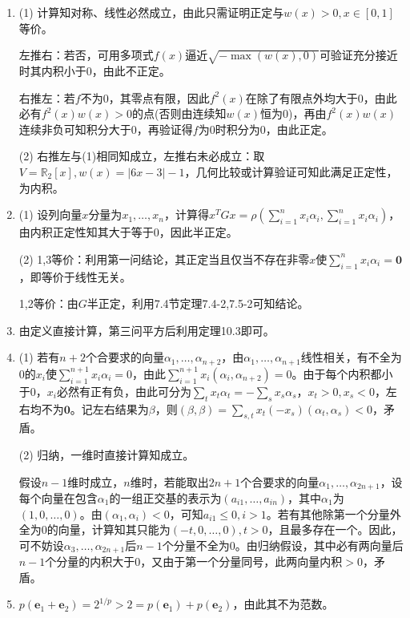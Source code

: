 \documentclass[a4paper,UTF8,fontset=windows]{ctexart}
\begin{document}
\begin{enumerate}
\item
(1) 计算知对称、线性必然成立，由此只需证明正定与$w(x)>0,x\in[0,1]$等价。

左推右：若否，可用多项式$f(x)$逼近$\sqrt{-\max(w(x),0)}$可验证充分接近时其内积小于0，由此不正定。

右推左：若$f$不为0，其零点有限，因此$f^2(x)$在除了有限点外均大于0，由此必有$f^2(x)w(x)>0$的点(否则由连续知$w(x)$恒为0)，再由$f^2(x)w(x)$连续非负可知积分大于0，再验证得$f$为0时积分为0，由此正定。

(2) 右推左与(1)相同知成立，左推右未必成立：取$V=\mathbb{R}_2[x],w(x)=|6x-3|-1$，几何比较或计算验证可知此满足正定性， 为内积。

\item
(1) 设列向量$x$分量为$x_1,\dots,x_n$，计算得$x^TGx=\rho\left(\sum_{i=1}^nx_i\alpha_i,\sum_{i=1}^nx_i\alpha_i\right)$，由内积正定性知其大于等于0，因此半正定。

(2) 1,3等价：利用第一问结论，其正定当且仅当不存在非零$x$使$\sum_{i=1}^nx_i\alpha_i=\mathbf{0}$，即等价于线性无关。

1,2等价：由$G$半正定，利用7.4节定理7.4-2,7.5-2可知结论。

\item
由定义直接计算，第三问平方后利用定理10.3即可。

\item
(1) 若有$n+2$个合要求的向量$\alpha_1,\dots,\alpha_{n+2}$，由$\alpha_1,\dots,\alpha_{n+1}$线性相关，有不全为0的$x_i$使$\sum_{i=1}^{n+1}x_i\alpha_i=0$，由此$\sum_{i=1}^{n+1}x_i(\alpha_i,\alpha_{n+2})=0$。由于每个内积都小于0，$x_i$必然有正有负，由此可分为$\sum_{t}x_t\alpha_t=-\sum_{s}x_s\alpha_s$，$x_t>0,x_s<0$，左右均不为$\mathbf{0}$。记左右结果为$\beta$，则$(\beta,\beta)=\sum_{s,t}x_t(-x_s)(\alpha_t,\alpha_s)<0$，矛盾。

(2) 归纳，一维时直接计算知成立。

假设$n-1$维时成立，$n$维时，若能取出$2n+1$个合要求的向量$\alpha_1,\dots,\alpha_{2n+1}$，设每个向量在包含$\alpha_1$的一组正交基的表示为$(a_{i1},\dots,a_{in})$，其中$\alpha_1$为$(1,0,\dots,0)$。由$(\alpha_1,\alpha_i)<0$，可知$a_{i1}\le0,i>1$。若有其他除第一个分量外全为0的向量，计算知其只能为$(-t,0,\dots,0),t>0$，且最多存在一个。因此，可不妨设$\alpha_3,\dots,\alpha_{2n+1}$后$n-1$个分量不全为0。由归纳假设，其中必有两向量后$n-1$个分量的内积大于0，又由于第一个分量同号，此两向量内积$>0$，矛盾。

\item
$p(\mathbf{e}_1+\mathbf{e}_2)=2^{1/p}>2=p(\mathbf{e}_1)+p(\mathbf{e}_2)$，由此其不为范数。
\end{enumerate}
\end{document}
